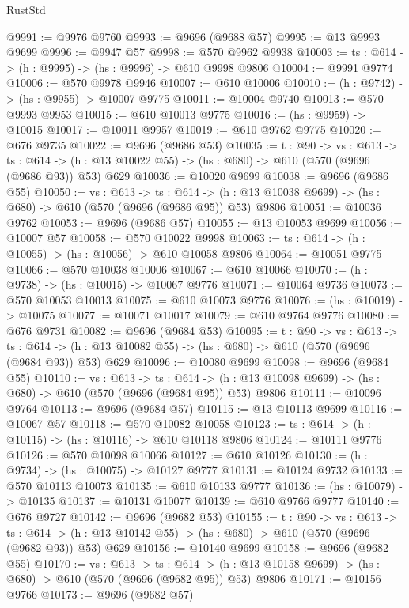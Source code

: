 \begin{lexlean}{RustStd}
\begin{coremodule}
@9991 := @9976 @9760
@9993 := @9696 (@9688 @57)
@9995 := @13 @9993 @9699
@9996 := @9947 @57
@9998 := @570 @9962 @9938
@10003 := {ts : @614} -> (h : @9995) -> (hs : @9996) -> @610 @9998 @9806
@10004 := @9991 @9774
@10006 := @570 @9978 @9946
@10007 := @610 @10006
@10010 := (h : @9742) -> (hs : @9955) -> @10007 @9775
@10011 := @10004 @9740
@10013 := @570 @9993 @9953
@10015 := @610 @10013 @9775
@10016 := (hs : @9959) -> @10015
@10017 := @10011 @9957
@10019 := @610 @9762 @9775
@10020 := @676 @9735
@10022 := @9696 (@9686 @53)
@10035 := {t : @90} ->
  {vs : @613} ->
  {ts : @614} -> (h : @13 @10022 @55) -> (hs : @680) -> @610 (@570 (@9696 (@9686 @93)) @53) @629
@10036 := @10020 @9699
@10038 := @9696 (@9686 @55)
@10050 := {vs : @613} ->
  {ts : @614} -> (h : @13 @10038 @9699) -> (hs : @680) -> @610 (@570 (@9696 (@9686 @95)) @53) @9806
@10051 := @10036 @9762
@10053 := @9696 (@9686 @57)
@10055 := @13 @10053 @9699
@10056 := @10007 @57
@10058 := @570 @10022 @9998
@10063 := {ts : @614} -> (h : @10055) -> (hs : @10056) -> @610 @10058 @9806
@10064 := @10051 @9775
@10066 := @570 @10038 @10006
@10067 := @610 @10066
@10070 := (h : @9738) -> (hs : @10015) -> @10067 @9776
@10071 := @10064 @9736
@10073 := @570 @10053 @10013
@10075 := @610 @10073 @9776
@10076 := (hs : @10019) -> @10075
@10077 := @10071 @10017
@10079 := @610 @9764 @9776
@10080 := @676 @9731
@10082 := @9696 (@9684 @53)
@10095 := {t : @90} ->
  {vs : @613} ->
  {ts : @614} -> (h : @13 @10082 @55) -> (hs : @680) -> @610 (@570 (@9696 (@9684 @93)) @53) @629
@10096 := @10080 @9699
@10098 := @9696 (@9684 @55)
@10110 := {vs : @613} ->
  {ts : @614} -> (h : @13 @10098 @9699) -> (hs : @680) -> @610 (@570 (@9696 (@9684 @95)) @53) @9806
@10111 := @10096 @9764
@10113 := @9696 (@9684 @57)
@10115 := @13 @10113 @9699
@10116 := @10067 @57
@10118 := @570 @10082 @10058
@10123 := {ts : @614} -> (h : @10115) -> (hs : @10116) -> @610 @10118 @9806
@10124 := @10111 @9776
@10126 := @570 @10098 @10066
@10127 := @610 @10126
@10130 := (h : @9734) -> (hs : @10075) -> @10127 @9777
@10131 := @10124 @9732
@10133 := @570 @10113 @10073
@10135 := @610 @10133 @9777
@10136 := (hs : @10079) -> @10135
@10137 := @10131 @10077
@10139 := @610 @9766 @9777
@10140 := @676 @9727
@10142 := @9696 (@9682 @53)
@10155 := {t : @90} ->
  {vs : @613} ->
  {ts : @614} -> (h : @13 @10142 @55) -> (hs : @680) -> @610 (@570 (@9696 (@9682 @93)) @53) @629
@10156 := @10140 @9699
@10158 := @9696 (@9682 @55)
@10170 := {vs : @613} ->
  {ts : @614} -> (h : @13 @10158 @9699) -> (hs : @680) -> @610 (@570 (@9696 (@9682 @95)) @53) @9806
@10171 := @10156 @9766
@10173 := @9696 (@9682 @57)

\end{coremodule}
\end{lexlean}
